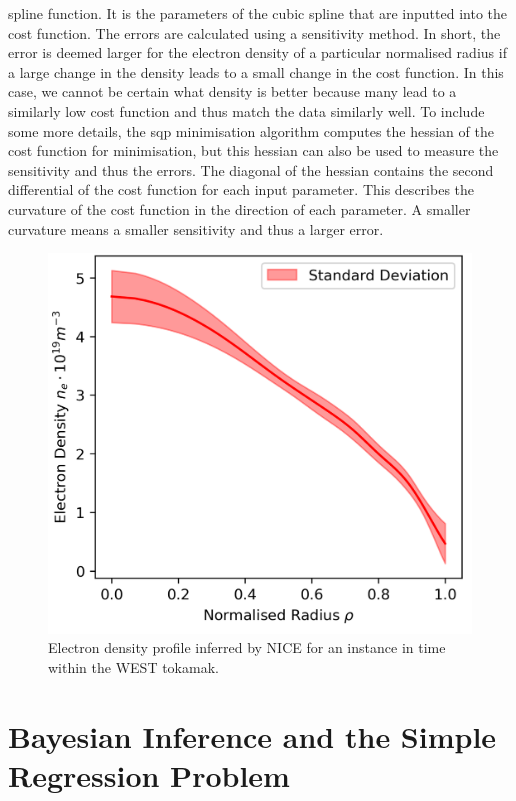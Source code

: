 spline function. It is the parameters of the cubic spline that are inputted into the cost function. The errors are calculated using a sensitivity method. In short, the error is deemed larger for the electron density of a particular normalised radius if a large change in the density leads to a small change in the cost function. In this case, we cannot be certain what density is better because many lead to a similarly low cost function and thus match the data similarly well. To include some more details, the \gls{sqp} minimisation algorithm computes the hessian of the cost function for minimisation, but this hessian can also be used to measure the sensitivity and thus the errors. The diagonal of the hessian contains the second differential of the cost function for each input parameter. This describes the curvature of the cost function in the direction of each parameter. A smaller curvature means a smaller sensitivity and thus a larger error.

\begin{figure}
  \centering
  \includegraphics[width=13cm]{images/Final/nice.png}
  \caption{Electron density profile inferred by NICE for an instance in time within the WEST tokamak.}
  \label{fig:nice_example}
\end{figure}

\section{Bayesian Inference and the Simple Regression Problem}
\label{sec:BIandSRP}

